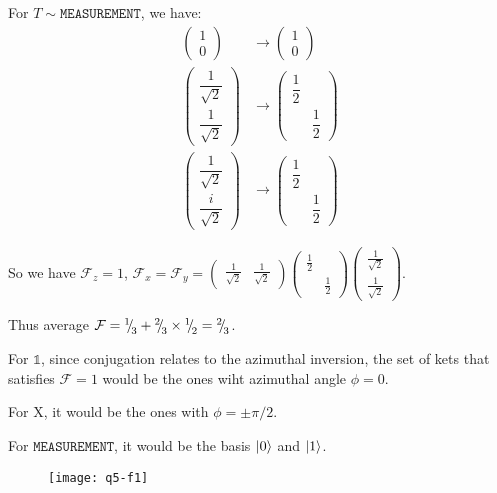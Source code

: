 \begin{parts}
	For $T \sim \mathtt{MEASUREMENT}$, we have:
	\begin{align*}
		\begin{pmatrix}
			1 \\ 0
		\end{pmatrix} &\rightarrow
		\begin{pmatrix}
			1 \\ 0
		\end{pmatrix} \\
		\begin{pmatrix}
			\dfrac{1}{\sqrt{2}} \\[1em] \dfrac{1}{\sqrt{2}}
		\end{pmatrix} &\rightarrow
		\begin{pmatrix}
			\dfrac{1}{2} & \\[1em] & \dfrac{1}{2}
		\end{pmatrix} \\
		\begin{pmatrix}
			\dfrac{1}{\sqrt{2}} \\[1em] \dfrac{i}{\sqrt{2}}
		\end{pmatrix} &\rightarrow
		\begin{pmatrix}
			\dfrac{1}{2} & \\[1em] & \dfrac{1}{2}
		\end{pmatrix}
	\end{align*}
	
	So we have $\mathcal{F}_z = 1$, $\mathcal{F}_x = \mathcal{F}_y =
	\begin{pmatrix}
	\frac{1}{\sqrt{2}} & \frac{1}{\sqrt{2}}
	\end{pmatrix}
	\begin{pmatrix}
		\frac{1}{2} & \\ & \frac{1}{2}
	\end{pmatrix}
	\begin{pmatrix}
		\frac{1}{\sqrt{2}} \\ \frac{1}{\sqrt{2}}
	\end{pmatrix}$.
	
	Thus average $\mathcal{F} = {{}^{1}{\mskip -5mu/\mskip -3mu}_{3}} + {{}^{2}{\mskip -5mu/\mskip -3mu}_{3}} \times {{}^{1}{\mskip -5mu/\mskip -3mu}_{2}} = {{}^{2}{\mskip -5mu/\mskip -3mu}_{3}}$.
	
	For $\mathds{1}$, since conjugation relates to the azimuthal inversion, the set of kets that satisfies $\mathcal{F} = 1$ would be the ones wiht azimuthal angle $\phi = 0$.
	
	For $\mathrm{X}$, it would be the ones with $\phi = \pm\pi/2$.
	
	For $\mathtt{MEASUREMENT}$, it would be the basis $\ket{0}$ and $\ket{1}$.
	
	\begin{figure}[H]
		\centering
		\texttt{[image: q5-f1]}
	\end{figure}
\end{parts}